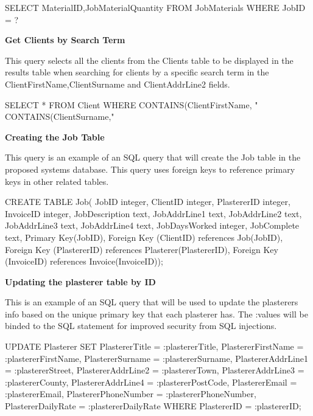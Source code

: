 \begin{sql}
SELECT MaterialID,JobMaterialQuantity FROM JobMaterials WHERE JobID = ? 
\end{sql}


\textbf{Get Clients by Search Term}
\begin{flushleft}
This query selects all the clients from the Clients table to be displayed in the results table when searching for clients by a specific search term in the ClientFirstName,ClientSurname and ClientAddrLine2 fields.
\begin{sql}
SELECT * FROM Client WHERE CONTAINS(ClientFirstName, "%
CONTAINS(ClientSurname,"%
\end{sql}
\end{flushleft}

\textbf{Creating the Job Table}
\begin{flushleft}
This query is an example of an SQL query that will create the Job table in the proposed systems database. This query uses foreign keys to reference primary keys in other related tables.
\begin{sql}
CREATE TABLE Job(
JobID integer,
ClientID integer,
PlastererID integer,
InvoiceID integer,
JobDescription text,
JobAddrLine1 text,
JobAddrLine2 text,
JobAddrLine3 text,
JobAddrLine4 text,
JobDaysWorked integer,
JobComplete text,
Primary Key(JobID),
Foreign Key (ClientID) references Job(JobID),
Foreign Key (PlastererID) references Plasterer(PlastererID),
Foreign Key (InvoiceID) references Invoice(InvoiceID));
\end{sql}
\end{flushleft}

\textbf{Updating the plasterer table by ID}
\begin{flushleft}
This is an example of an SQL query that will be used to update the plasterers info based on the unique primary key that each plasterer has. The :values will be binded to the SQL statement for improved security from SQL injections.
\begin{sql}
UPDATE Plasterer SET 
PlastererTitle = :plastererTitle,
PlastererFirstName = :plastererFirstName,
PlastererSurname = :plastererSurname,
PlastererAddrLine1 = :plastererStreet,
PlastererAddrLine2 = :plastererTown,
PlastererAddrLine3 = :plastererCounty,
PlastererAddrLine4 = :plastererPostCode,
PlastererEmail = :plastererEmail,
PlastererPhoneNumber = :plastererPhoneNumber,
PlastererDailyRate = :plastererDailyRate
WHERE PlastererID = :plastererID;  
\end{sql}
\end{flushleft}

